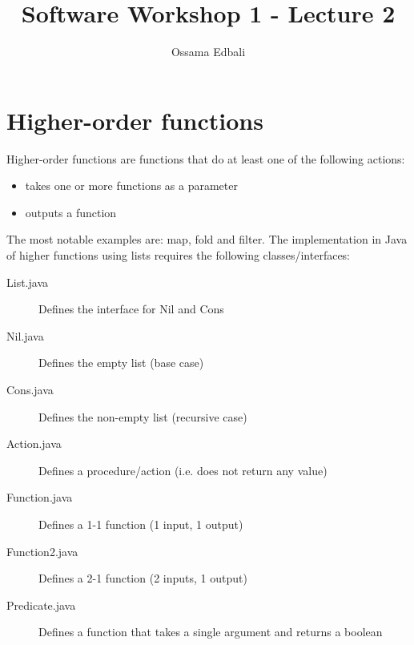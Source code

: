 \documentclass{article}
\title{Software Workshop 1 - Lecture 2}
\author{Ossama Edbali}
\begin{document}
	\maketitle
	
	\section{Higher-order functions}
	Higher-order functions are functions that do at least one of the following actions:
	\begin{itemize}
		\item takes one or more functions as a parameter
		\item outputs a function
	\end{itemize}
	
	The most notable examples are: map, fold and filter.
	The implementation in Java of higher functions using lists
	requires the following classes/interfaces:
	\begin{description}
		\item[List.java] Defines the interface for Nil and Cons
		\item[Nil.java] Defines the empty list (base case)
		\item[Cons.java] Defines the non-empty list (recursive case)
		\item[Action.java] Defines a procedure/action (i.e. does not return any value)
		\item[Function.java] Defines a 1-1 function (1 input, 1 output)
		\item[Function2.java] Defines a 2-1 function (2 inputs, 1 output)
		\item[Predicate.java] Defines a function that takes a single argument and returns a
		boolean
	\end{description}	
	
\end{document}
